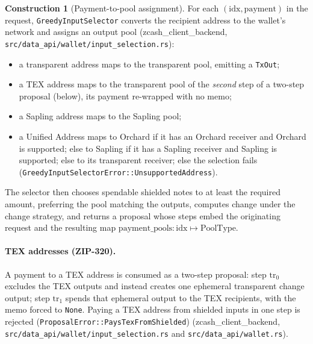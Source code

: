 \documentclass[11pt,a4paper]{article}
\theoremstyle{definition}
\newtheorem{construction}[theorem]{Construction}
\begin{document}
\begin{construction}[Payment-to-pool assignment]\label{def:zip321-pools}
For each $(\mathrm{idx}, \mathrm{payment})$ in the request,
\texttt{GreedyInputSelector} converts the recipient address to the wallet's
network and assigns an output pool
(\textsf{zcash\_client\_backend},
\texttt{src/data\_api/wallet/input\_selection.rs}):
\begin{itemize}
\item a transparent address maps to the transparent pool, emitting a
  \texttt{TxOut};
\item a TEX address maps to the transparent pool of the \emph{second} step
  of a two-step proposal (below), its payment re-wrapped with no memo;
\item a Sapling address maps to the Sapling pool;
\item a Unified Address maps to Orchard if it has an Orchard receiver and
  Orchard is supported; else to Sapling if it has a Sapling receiver and
  Sapling is supported; else to its transparent receiver; else the selection
  fails (\texttt{GreedyInputSelectorError::UnsupportedAddress}).
\end{itemize}
The selector then chooses spendable shielded notes to at least the required
amount, preferring the pool matching the outputs, computes change under the
change strategy, and returns a proposal whose steps embed the originating
request and the resulting map
$\mathrm{payment\_pools} : \mathrm{idx} \mapsto \mathrm{PoolType}$.
\end{construction}

\paragraph{TEX addresses (ZIP-320).} A payment to a TEX address is consumed
as a two-step proposal: step $\mathrm{tr}_0$ excludes the TEX outputs and
instead creates one ephemeral transparent change output; step
$\mathrm{tr}_1$ spends that ephemeral output to the TEX recipients, with the
memo forced to \texttt{None}. Paying a TEX address from shielded inputs in
one step is rejected (\texttt{ProposalError::PaysTexFromShielded})
(\textsf{zcash\_client\_backend},
\texttt{src/data\_api/wallet/input\_selection.rs} and
\texttt{src/data\_api/wallet.rs}).
\end{document}
